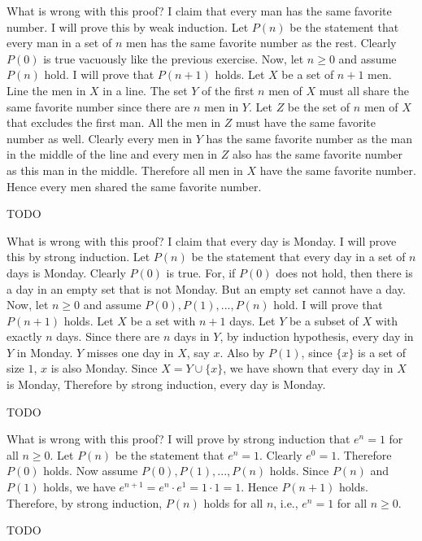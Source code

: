 \begin{ex}
What is wrong with this proof?
I claim that every man has the same favorite number.
I will prove this by weak induction.
Let $P(n)$ be the statement that every man in a set of $n$
men has the same favorite number as the rest.
Clearly $P(0)$ is true vacuously like the previous exercise.
Now, let $n \geq 0$ and assume $P(n)$ hold.
I will prove that $P(n + 1)$ holds.
Let $X$ be a set of $n + 1$ men.
Line the men in $X$ in a line.
The set $Y$ of the first $n$ men of $X$ must all share the same favorite number
since there are $n$ men in $Y$.
Let $Z$ be the set of $n$ men of $X$ that excludes the first man.
All the men in $Z$ must have the same favorite number as well.
Clearly every men in $Y$ has the same favorite number as the man in
the middle of the line and every men in $Z$ also has the same favorite number
as this man in the middle.
Therefore all men in $X$ have the same favorite number.
Hence every men shared the same favorite number.
\end{ex}
TODO

\begin{ex}
What is wrong with this proof?
I claim that every day is Monday.
I will prove this by strong induction.
Let $P(n)$ be the statement that every day in a set of $n$
days is Monday.
Clearly $P(0)$ is true.
For, if $P(0)$ does not hold, then there is a day in an empty set
that is not Monday.
But an empty set cannot have a day.
Now, let $n \geq 0$ and assume $P(0), P(1), ..., P(n)$ hold.
I will prove that $P(n + 1)$ holds.
Let $X$ be a set with $n + 1$ days.
Let $Y$ be a subset of $X$ with exactly $n$ days.
Since there are $n$ days in $Y$, by induction hypothesis,
every day in $Y$ in Monday.
$Y$ misses one day in $X$, say $x$.
Also by $P(1)$, since $\{x\}$ is a set of size $1$, $x$ is also Monday. 
Since $X = Y \cup \{x\}$, we have shown
that every day in $X$ is Monday,
Therefore by strong induction, every day is Monday.
\end{ex}
TODO

\begin{ex}
What is wrong with this proof?
I will prove by strong induction that $e^n = 1$ for all $n \geq 0$.
Let $P(n)$ be the statement that $e^n = 1$.
Clearly $e^0 = 1$.
Therefore $P(0)$ holds.
Now assume $P(0), P(1), ..., P(n)$ holds.
Since $P(n)$ and $P(1)$ holds,
we have $e^{n + 1} = e^n \cdot e^1 = 1 \cdot 1 = 1$. 
Hence $P(n + 1)$ holds.
Therefore, by strong induction, $P(n)$ holds for all $n$, i.e.,
$e^n = 1$ for all $n \geq 0$.
\end{ex}
TODO

